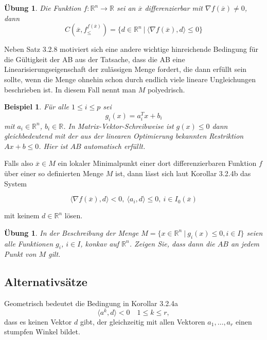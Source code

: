 \documentclass[11pt]{scrreprt}
\newcounter{thm}
\theoremstyle{thmstyle}
\numberwithin{thm}{section}
\newtheorem{beispiel}[thm]{Beispiel}
\newtheorem{uebung}[thm]{Übung}
\begin{document}
\begin{uebung}
	Die Funktion $f \colon \mathbb{R}^n \rightarrow \mathbb{R}$ sei an $\overline{x}$ differenzierbar mit $\nabla f(\overline{x}) \neq 0$, dann
	$$ C \left( \overline{x}, f_{\leq}^{f(\overline{x})} \right) = \big\{ d \in \mathbb{R}^n ~|~ \langle \nabla f(\overline{x}), d \rangle \leq 0 \big\} $$
\end{uebung} 
 Neben Satz 3.2.8 motiviert sich eine andere wichtige hinreichende Bedingung für die Gültigkeit der AB aus der Tatsache, dass die AB eine Linearisierungseigenschaft der zulässigen Menge fordert, die dann erfüllt sein sollte, wenn die Menge ohnehin schon durch endlich viele lineare Ungleichungen beschrieben ist. In diesem Fall nennt man $M$ polyedrisch.
 
\begin{beispiel}
	Für alle $1 \leq i \leq p$ sei
$$g_i(x) =a_i^T x + b_i $$
	mit $a_i \in \mathbb{R}^n$, $b_i \in \mathbb{R}$. In Matrix-Vektor-Schreibweise ist $g(x) \leq 0$ dann gleichbedeutend mit der aus der linearen Optimierung bekannten Restriktion $Ax + b \leq 0$. Hier ist $AB$ automatisch erfüllt.	
\end{beispiel}

Falls also $\overline{x} \in M$ ein lokaler Minimalpunkt einer dort differenzierbaren Funktion $f$ über einer so definierten Menge $M$ ist, dann lässt sich laut Korollar 3.2.4b das System

	$$	\langle \nabla f(\overline{x}), d \rangle < 0, ~\langle a_i, d \rangle \leq 0, ~ i \in I_0(\overline{x})	$$

mit keinem $d \in \mathbb{R}^n$ lösen.
 
\setcounter{thm}{11}
 
\begin{uebung}
	In der Beschreibung der Menge $M = \{ x \in \mathbb{R}^n ~|~ g_i(x) \leq 0, i \in I\}$ seien alle Funktionen $g_i$, $i \in I$, konkav auf $\mathbb{R}^n$. Zeigen Sie, dass dann die $AB$ an jedem Punkt von $M$ gilt.
\end{uebung}

\subsection*{Alternativsätze}
 
Geometrisch bedeutet die Bedingung in Korollar 3.2.4a
$$ \langle a^k, d \rangle < 0 \quad 1 \leq k \leq r,$$  dass es keinen Vektor $d$ gibt, der gleichzeitig mit allen Vektoren $a_1, \dotsc , a_r$ einen stumpfen Winkel bildet.
 
\end{document}
